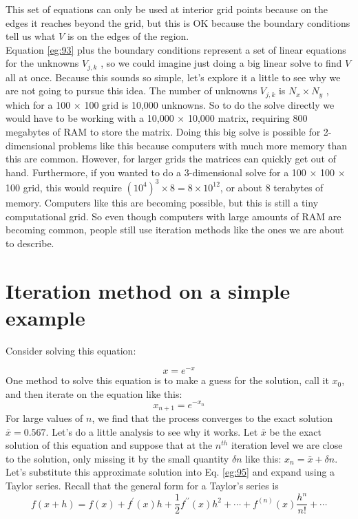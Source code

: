 \documentclass{book}
\theoremstyle{plain}
\theoremstyle{definition}
\numberwithin{exm}{chapter}
\theoremstyle{remark}
\theoremstyle{summary}
\theoremstyle{overview}
\begin{document}
This set of equations can only be used at interior grid points because on the edges
it reaches beyond the grid, but this is OK because the boundary conditions tell us
what $V$ is on the edges of the region.
\\
Equation \eqref{eg:93} plus the boundary conditions represent a set of linear equations for the unknowns $V_{j,k}$ , so we could imagine just doing a big linear solve to
find $V$ all at once. Because this sounds so simple, let\rq s explore it a little to see why
we are not going to pursue this idea. The number of unknowns $V_{j,k}$ is $N_x × N_y$ ,
which for a 100 $×$ 100 grid is 10,000 unknowns. So to do the solve directly we would
have to be working with a 10,000 $×$ 10,000 matrix, requiring 800 megabytes of RAM
to store the matrix. Doing this big solve is possible for 2-dimensional problems
like this because computers with much more memory than this are common.
However, for larger grids the matrices can quickly get out of hand. Furthermore,
if you wanted to do a 3-dimensional solve for a 100 $×$ 100 $×$ 100 grid, this would
require $(10^4)^3 × 8 = 8 × 10^{12}$, or about 8 terabytes of memory. Computers like this
are becoming possible, but this is still a tiny computational grid. So even though
computers with large amounts of RAM are becoming common, people still use
iteration methods like the ones we are about to describe.

\section*{Iteration method on a simple example}
Consider solving this equation:

\begin{equation}\label{eq:94}
x = e^{-x}
\end{equation}
One method to solve this equation is to make a guess for the solution, call it $x_0$,
and then iterate on the equation like this:
\begin{equation}\label{eq:95}
x_{n+1}=e^{-x_{n}}
\end{equation}
For large values of $n$, we find that the process converges to the exact solution
$ \bar{x} = 0.567$. Let\rq s do a little analysis to see why it works. Let $\bar{x}$ be the exact solution
of this equation and suppose that at the $n^{th}$ iteration level we are close to the
solution, only missing it by the small quantity $\delta n$ like this: $x_n = \bar{x} + \delta n$. Let\rq s
substitute this approximate solution into Eq. \eqref{eg:95} and expand using a Taylor
series. Recall that the general form for a Taylor\rq s series is
\begin{equation}\label{eq:96}
f(x+h)=f(x)+f^{\prime}(x) h+\frac{1}{2} f^{\prime \prime}(x) h^{2}+\cdots+f^{(n)}(x) \frac{h^{n}}{n !}+\cdots
\end{equation}
\end{document}
